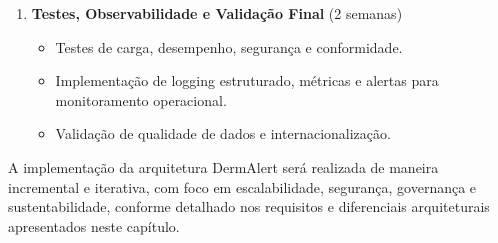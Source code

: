 \begin{enumerate}
\begin{itemize}
        \item Configuração do Delta Sharing para compartilhamento seguro e auditável.
        \item Implementação de RBAC, criptografia, anonimização e conformidade com LGPD.
        \item Integração das APIs RESTful via FastAPI para acesso e integração externa.
    \end{itemize}
    \item \textbf{Testes, Observabilidade e Validação Final} (2 semanas)
    \begin{itemize}
        \item Testes de carga, desempenho, segurança e conformidade.
        \item Implementação de logging estruturado, métricas e alertas para monitoramento operacional.
        \item Validação de qualidade de dados e internacionalização.
    \end{itemize}
\end{enumerate}

A implementação da arquitetura DermAlert será realizada de maneira incremental e iterativa, com foco em escalabilidade, segurança, governança e sustentabilidade, conforme detalhado nos requisitos e diferenciais arquiteturais apresentados neste capítulo.